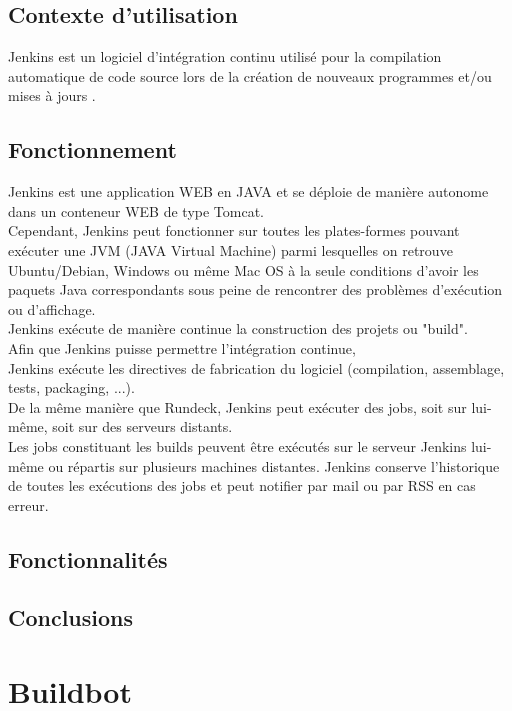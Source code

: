 \documentclass[12pt]{article}
\begin{document}
\subsection{Contexte d'utilisation}

Jenkins est un logiciel d'intégration continu utilisé pour la compilation automatique de code source lors de la création de nouveaux programmes et/ou mises à jours .

\subsection{Fonctionnement}

Jenkins est une application WEB en JAVA et se déploie de manière autonome dans un conteneur WEB de type Tomcat.
\\
Cependant, Jenkins peut fonctionner sur toutes les plates-formes pouvant exécuter une JVM (JAVA Virtual Machine) parmi lesquelles on retrouve Ubuntu/Debian, Windows ou même Mac OS à la seule conditions d'avoir les paquets Java correspondants sous peine de rencontrer des problèmes d'exécution ou d'affichage.
\\
Jenkins exécute de manière continue la construction des projets ou "build".
\\ 
Afin que Jenkins puisse permettre l'intégration continue, 
\\
Jenkins exécute les directives de fabrication du logiciel (compilation, assemblage, tests, packaging, ...).
\\
De la même manière que Rundeck, Jenkins peut exécuter des jobs, soit sur lui-même, soit sur des serveurs distants.
\\
Les jobs constituant les builds peuvent être exécutés sur le serveur Jenkins lui-même ou répartis sur plusieurs machines distantes. Jenkins conserve l'historique de toutes les exécutions des jobs et peut notifier par mail ou par RSS en cas erreur.

\subsection{Fonctionnalités}
\subsection{Conclusions}

\section{Buildbot}
\end{document}
